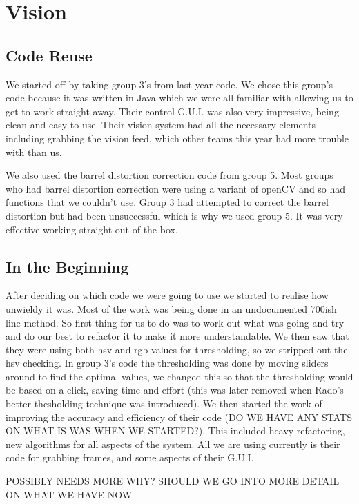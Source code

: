 \section{Vision}

\subsection{Code Reuse}

We started off by taking group 3's from last year code.  We chose this group's code because it was written in Java which we were all familiar with allowing us to get to work straight away.  Their control G.U.I. was also very impressive, being clean and easy to use.  Their vision system had all the necessary elements including grabbing the vision feed, which other teams this year had more trouble with than us.

We also used the barrel distortion correction code from group 5.  Most groups who had barrel distortion correction were using a variant of openCV and so had functions that we couldn't use.  Group 3 had attempted to correct the barrel distortion but had been unsuccessful which is why we used group 5.  It was very effective working straight out of the box.

\subsection{In the Beginning}

After deciding on which code we were going to use we started to realise how unwieldy it was.  Most of the work was being done in an undocumented 700ish line method.  So first thing for us to do was to work out what was going and try and do our best to refactor it to make it more understandable.  We then saw that they were using both hsv and rgb values for thresholding, so we stripped out the hsv checking.  In group 3's code the thresholding was done by moving sliders around to find the optimal values, we changed this so that the thresholding would be based on a click, saving time and effort (this was later removed when Rado's better thesholding technique was introduced).  We then started the work of improving the accuracy and efficiency of their code (DO WE HAVE ANY STATS ON WHAT IS WAS WHEN WE STARTED?).  This included heavy refactoring, new algorithms for all aspects of the system.  All we are using currently is their code for grabbing frames, and some aspects of their G.U.I.

POSSIBLY NEEDS MORE WHY?  SHOULD WE GO INTO MORE DETAIL ON WHAT WE HAVE NOW


